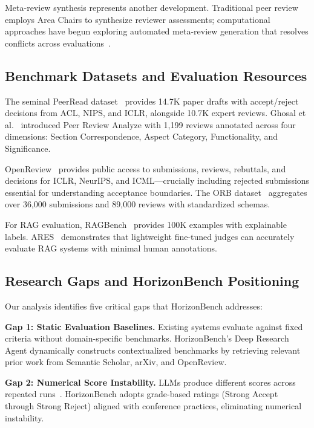 Meta-review synthesis represents another development. Traditional peer review employs Area Chairs to synthesize reviewer assessments; computational approaches have begun exploring automated meta-review generation that resolves conflicts across evaluations~\cite{li2023meta}.

\subsection{Benchmark Datasets and Evaluation Resources}

The seminal PeerRead dataset~\cite{kang2018peerread} provides 14.7K paper drafts with accept/reject decisions from ACL, NIPS, and ICLR, alongside 10.7K expert reviews. Ghosal et al.~\cite{ghosal2022peer} introduced Peer Review Analyze with 1,199 reviews annotated across four dimensions: Section Correspondence, Aspect Category, Functionality, and Significance.

OpenReview~\cite{openreview} provides public access to submissions, reviews, rebuttals, and decisions for ICLR, NeurIPS, and ICML---crucially including rejected submissions essential for understanding acceptance boundaries. The ORB dataset~\cite{orb2023} aggregates over 36,000 submissions and 89,000 reviews with standardized schemas.

For RAG evaluation, RAGBench~\cite{ragbench2024} provides 100K examples with explainable labels. ARES~\cite{ares2024} demonstrates that lightweight fine-tuned judges can accurately evaluate RAG systems with minimal human annotations.

\subsection{Research Gaps and HorizonBench Positioning}

Our analysis identifies five critical gaps that HorizonBench addresses:

\textbf{Gap 1: Static Evaluation Baselines.} Existing systems evaluate against fixed criteria without domain-specific benchmarks. HorizonBench's Deep Research Agent dynamically constructs contextualized benchmarks by retrieving relevant prior work from Semantic Scholar, arXiv, and OpenReview.

\textbf{Gap 2: Numerical Score Instability.} LLMs produce different scores across repeated runs~\cite{zhou2024llm}. HorizonBench adopts grade-based ratings (Strong Accept through Strong Reject) aligned with conference practices, eliminating numerical instability.

